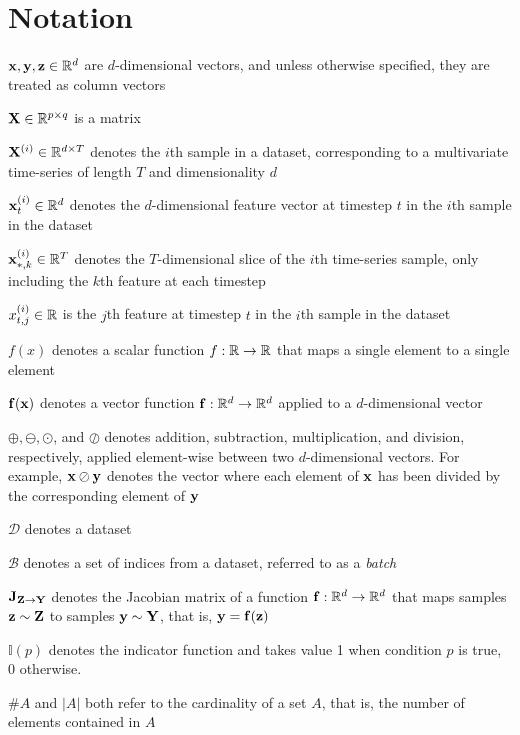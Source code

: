 \documentclass{statsmsc}
\begin{document}
{\chapter*{Notation}\thispagestyle{plain}
    $\mathbf{x}, \mathbf{y}, \mathbf{z}\in\mathbb{R}^d$ are $d$-dimensional vectors, and unless otherwise specified, they are
    treated as column vectors

    $\mathbf{X} \in \mathbb{R}^{p \times q}$ is a matrix

    $\mathbf{X}^{(i)} \in \mathbb{R}^{d \times T}$ denotes the $i$th sample in a dataset, corresponding to a multivariate time-series of length $T$ and dimensionality $d$

    $\mathbf{x}^{(i)}_t \in \mathbb{R}^d$ denotes the $d$-dimensional feature vector at timestep $t$ in the $i$th sample in the dataset

    $\mathbf{x}^{(i)}_{*,k} \in \mathbb{R}^T$ denotes the $T$-dimensional slice of the $i$th time-series sample, only including the $k$th feature at each timestep

    $x^{(i)}_{t,j}\in\mathbb{R}$ is the $j$th feature at timestep $t$ in the $i$th sample in the dataset

    $f(x)$ denotes a scalar function $f: \mathbb{R} \rightarrow {\mathbb{R}}$ that maps a single element to a single element

    $\mathbf{f}(\mathbf{x})$ denotes a vector function $\mathbf{f}:\mathbb{R}^d \rightarrow {\mathbb{R}^d}$ applied to a $d$-dimensional vector

    $\oplus, \ominus, \odot$, and $\oslash$ denotes addition, subtraction, multiplication, and division, respectively, applied element-wise between two $d$-dimensional vectors. For example, $\mathbf{x} \oslash \mathbf{y}$ denotes the vector where each element of $\mathbf{x}$ has been divided by the corresponding element of $\mathbf{y}$

    $\mathcal{D}$ denotes a dataset

    $\mathcal{B}$ denotes a set of indices from a dataset, referred to as a \textit{batch}

    $\mathbf{J}_{\mathbf{Z} \rightarrow {\mathbf{Y}}}$ denotes the Jacobian matrix of a function $\mathbf{f} : \mathbb{R}^d \rightarrow {\mathbb{R}^d}$ that maps samples $\mathbf{z} \sim \mathbf{Z}$ to samples $\mathbf{y} \sim \mathbf{Y}$, that is,
    $\mathbf{y}=\mathbf{f}(\mathbf{z})$

    $\mathbb{I}(p)$ denotes the indicator function and takes value 1 when condition $p$ is true,
    0 otherwise.

    $\#A$ and $|A|$ both refer to the cardinality of a set $A$, that is, the number of elements contained in $A$

}
\end{document}
